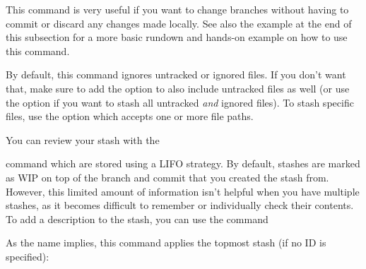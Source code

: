 \begin{flushleft}
	This command is very useful if you want to change branches without having to
	commit or discard any changes made locally. See also the example at the end of
	this subsection for a more basic rundown and hands-on example on how to use this
	command.
\end{flushleft}

\begin{flushleft}
\end{flushleft}

\begin{flushleft}
	By default, this command ignores untracked or ignored files. If you don't want
	that, make sure to add the  option to also include
	untracked files as well (or use the   option if you want to stash
	all untracked \emph{and} ignored files). To stash specific files, use the 
	option which accepts one or more file paths.
\end{flushleft}

\begin{flushleft}
	You can review your stash with the
\end{flushleft}

\begin{flushleft}
\end{flushleft}

\begin{flushleft}
	command which are stored using a LIFO strategy. By default, stashes are marked as
	WIP on top of the branch and commit that you created the stash from. However, this
	limited amount of information isn't helpful when you have multiple stashes, as it
	becomes difficult to remember or individually check their contents. To add a description
	to the stash, you can use the command
\end{flushleft}

\begin{flushleft}
\end{flushleft}

\begin{flushleft}
	As the name implies, this command applies the topmost stash (if no ID is specified):
\end{flushleft}

\begin{flushleft}
\end{flushleft}

